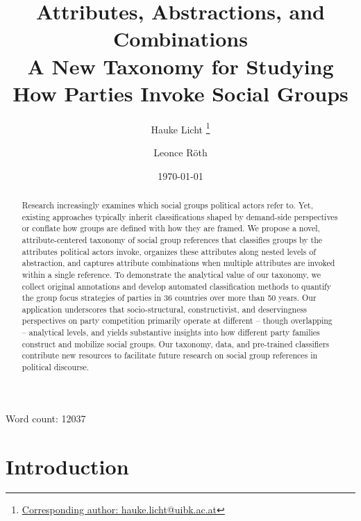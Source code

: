 \documentclass[12pt]{article}
\title{%
    Attributes, Abstractions, and Combinations%
    \\\Large A New Taxonomy for Studying How Parties Invoke Social Groups%
}
\author[1]{%
  Hauke Licht%
  \thanks{%
    \href{mailto:Corresponding author: hauke.licht@uibk.ac.at}{Corresponding author: hauke.licht@uibk.ac.at}
  }
}
\author[2]{Leonce Röth}
\affil[1]{Department of Political Science \& Digital Science Center, University of Innsbruck, Austria}
\affil[2]{Geschwister Scholl Institute of Political Science, LMU Munich, Germany}
\date{\today}
\begin{document}
\maketitle
\begin{abstract}
\noindent%
Research increasingly examines which social groups political actors refer to.
Yet, existing approaches typically inherit classifications shaped by demand-side perspectives or conflate how groups are defined with how they are framed.
We propose a novel, attribute-centered taxonomy of social group references that classifies groups by the attributes political actors invoke, organizes these attributes along nested levels of abstraction, and captures attribute combinations when multiple attributes are invoked within a single reference.
To demonstrate the analytical value of our taxonomy, we collect original annotations and develop automated classification methods to quantify the group focus strategies of parties in 36 countries over more than 50 years.
Our application underscores that socio-structural, constructivist, and deservingness perspectives on party competition primarily operate at different -- though overlapping -- analytical levels, and yields substantive insights into how different party families construct and mobilize social groups.
Our taxonomy, data, and pre-trained classifiers contribute new resources to facilitate future research on social group references in political discourse.
\end{abstract}


\begin{center}
Word count: 12037
\end{center}

\thispagestyle{empty}
\clearpage
\setcounter{page}{1}
\setlength{\parskip}{0pt}
\setlength{\parindent}{20pt}

\section{Introduction}\label{introduction}
\end{document}
